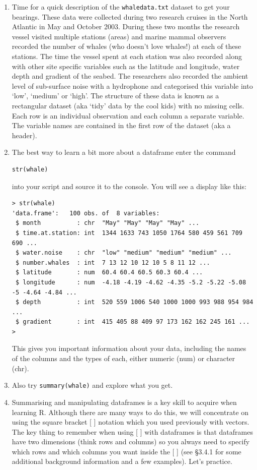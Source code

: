 \documentclass[12pt]{article}
\begin{document}
\begin{enumerate}
\item
Time for a quick description of the \verb|whaledata.txt| dataset to get your bearings. These data were collected during two research cruises in the North Atlantic in May and October 2003. During these two months the research vessel visited multiple stations (areas) and marine mammal observers recorded the number of whales (who doesn’t love whales!) at each of these stations. The time the vessel spent at each station was also recorded along with other site specific variables such as the latitude and longitude, water depth and gradient of the seabed. The researchers also recorded the ambient level of sub-surface noise with a hydrophone and categorised this variable into ‘low’, ‘medium’ or ‘high’. The structure of these data is known as a rectangular dataset (aka ‘tidy’ data by the cool kids) with no missing cells. Each row is an individual observation and each column a separate variable. The variable names are contained in the first row of the dataset (aka a header).

\item
The best way to learn a bit more about a dataframe enter the command
\begin{lstlisting}
str(whale)
\end{lstlisting}
 into your script and source it to the console.  You will 
see a display like this:
\begin{lstlisting}[basicstyle=\tiny]
> str(whale)
'data.frame':	100 obs. of  8 variables:
 $ month          : chr  "May" "May" "May" "May" ...
 $ time.at.station: int  1344 1633 743 1050 1764 580 459 561 709 690 ...
 $ water.noise    : chr  "low" "medium" "medium" "medium" ...
 $ number.whales  : int  7 13 12 10 12 10 5 8 11 12 ...
 $ latitude       : num  60.4 60.4 60.5 60.3 60.4 ...
 $ longitude      : num  -4.18 -4.19 -4.62 -4.35 -5.2 -5.22 -5.08 -5 -4.64 -4.84 ...
 $ depth          : int  520 559 1006 540 1000 1000 993 988 954 984 ...
 $ gradient       : int  415 405 88 409 97 173 162 162 245 161 ...
> 
 \end{lstlisting}
 This gives you important information about your data, including the names
 of the columns and the types of each, either numeric (num) or character (chr).

\item Also try \verb|summary(whale)| and explore what you get.


\item Summarising and manipulating dataframes is a key skill to acquire when learning R. Although there are many ways to do this, we will concentrate on using the square bracket [ ] notation which you used previously with vectors. The key thing to remember when using [ ] with dataframes is that dataframes have two dimensions (think rows and columns) so you always need to specify which rows and which columns you want inside the [ ] (see \S 3.4.1 for some additional background information and a few examples). Let's practice.


\end{enumerate}
\end{document}
